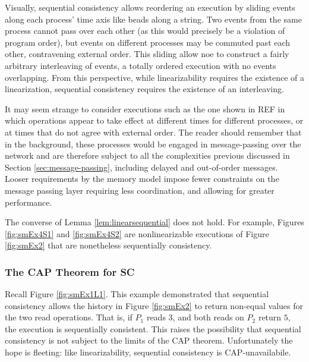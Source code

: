 \documentclass[]             %
{NASA}                       %
\theoremstyle{definition}
\begin{document}
Visually, sequential consistency allows reordering an execution by
sliding events along each process' time axis like beads along a
string.  Two events from the same process cannot pass over each other
(as this would precisely be a violation of program order), but events
on different processes may be commuted past each other, contravening
external order. This sliding allow noe to construct a fairly arbitrary
interleaving of events, a totally ordered execution with no events
overlapping. From this perspective, while linearizability requires the
existence of a linearization, sequential consistency requires the
existence of an interleaving.

It may seem strange to consider executions such as the one shown in
REF in which operations appear to take effect at different times for
different processes, or at times that do not agree with external
order. The reader should remember that in the background, these
processes would be engaged in message-passing over the network and are
therefore subject to all the complexities previous discussed in
Section \ref{sec:message-passing}, including delayed and out-of-order
messages. Looser requirements by the memory model impose fewer
constraints on the message passing layer requiring less coordination,
and allowing for greater performance.

The converse of Lemma \ref{lem:linearsequential} does not hold. For
example, Figures \ref{fig:smEx4S1} and \ref{fig:smEx4S2} are
nonlinearizable executions of Figure \ref{fig:smEx2} that are
nonetheless sequentially consistency.

\subsubsection{The CAP Theorem for SC}

Recall Figure \ref{fig:smEx1L1}. This example demonstrated that
sequential consistency allows the history in Figure \ref{fig:smEx2} to
return non-equal values for the two read operations. That is, if $P_1$
reads $3$, and both reads on $P_2$ return $5$, the execution is
sequentially consistent. This raises the possibility that sequential
consistency is not subject to the limits of the CAP
theorem. Unfortunately the hope is fleeting: like linearizability,
sequential consistency is CAP-unavailabile.
\end{document}
